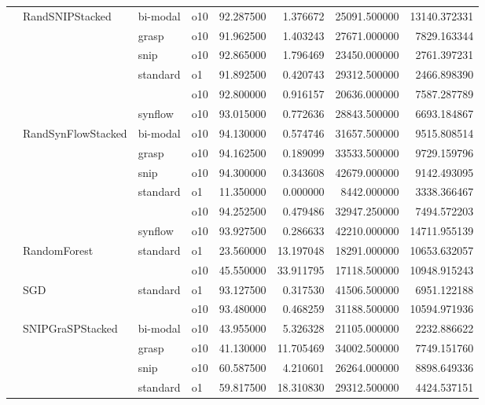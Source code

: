 \begin{longtable}{llllrrrr}
      & RandSNIPStacked & bi-modal & o10 &  92.287500 &   1.376672 &     25091.500000 &  13140.372331 \\
      &     & grasp & o10 &  91.962500 &   1.403243 &     27671.000000 &   7829.163344 \\
      &     & snip & o10 &  92.865000 &   1.796469 &     23450.000000 &   2761.397231 \\
      &     & standard & o1 &  91.892500 &   0.420743 &     29312.500000 &   2466.898390 \\
      &     &         & o10 &  92.800000 &   0.916157 &     20636.000000 &   7587.287789 \\
      &     & synflow & o10 &  93.015000 &   0.772636 &     28843.500000 &   6693.184867 \\
      & RandSynFlowStacked & bi-modal & o10 &  94.130000 &   0.574746 &     31657.500000 &   9515.808514 \\
      &     & grasp & o10 &  94.162500 &   0.189099 &     33533.500000 &   9729.159796 \\
      &     & snip & o10 &  94.300000 &   0.343608 &     42679.000000 &   9142.493095 \\
      &     & standard & o1 &  11.350000 &   0.000000 &      8442.000000 &   3338.366467 \\
      &     &         & o10 &  94.252500 &   0.479486 &     32947.250000 &   7494.572203 \\
      &     & synflow & o10 &  93.927500 &   0.286633 &     42210.000000 &  14711.955139 \\
      & RandomForest & standard & o1 &  23.560000 &  13.197048 &     18291.000000 &  10653.632057 \\
      &     &         & o10 &  45.550000 &  33.911795 &     17118.500000 &  10948.915243 \\
      & SGD & standard & o1 &  93.127500 &   0.317530 &     41506.500000 &   6951.122188 \\
      &     &         & o10 &  93.480000 &   0.468259 &     31188.500000 &  10594.971936 \\
      & SNIPGraSPStacked & bi-modal & o10 &  43.955000 &   5.326328 &     21105.000000 &   2232.886622 \\
      &     & grasp & o10 &  41.130000 &  11.705469 &     34002.500000 &   7749.151760 \\
      &     & snip & o10 &  60.587500 &   4.210601 &     26264.000000 &   8898.649336 \\
      &     & standard & o1 &  59.817500 &  18.310830 &     29312.500000 &   4424.537151 \\

\end{longtable}
